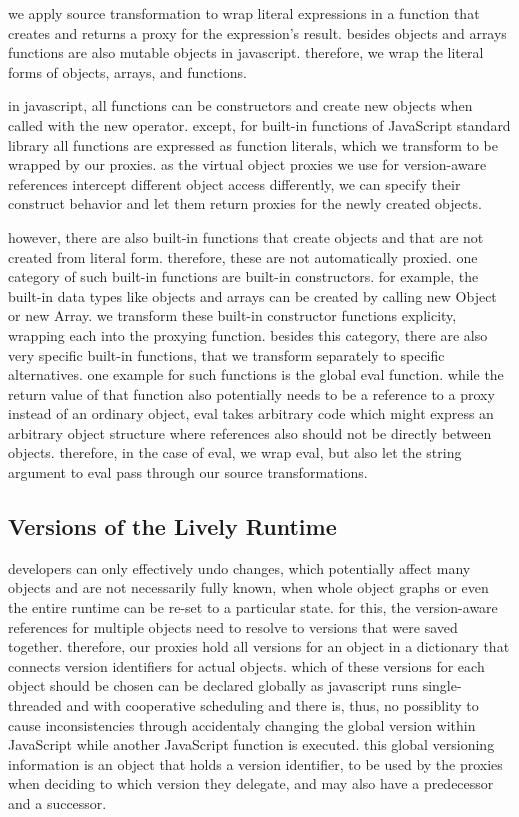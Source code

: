 we apply source transformation to wrap literal expressions in a function that creates and returns a proxy for the expression's result.
besides objects and arrays functions are also mutable objects in javascript.
therefore, we wrap the literal forms of objects, arrays, and functions.

in javascript, all functions can be constructors and create new objects when called with the new operator.
except, for built-in functions of JavaScript standard library all functions are expressed as function literals, which we transform to be wrapped by our proxies.
as the virtual object proxies we use for version-aware references intercept different object access differently, we can specify their construct behavior and let them return proxies for the newly created objects.

however, there are also built-in functions that create objects and that are not created from literal form.
therefore, these are not automatically proxied.
one category of such built-in functions are built-in constructors.
for example, the built-in data types like objects and arrays can be created by calling new Object or new Array.
we transform these built-in constructor functions explicity, wrapping each into the proxying function.
besides this category, there are also very specific built-in functions, that we transform separately to specific alternatives.
one example for such functions is the global eval function.
while the return value of that function also potentially needs to be a reference to a proxy instead of an ordinary object, eval takes arbitrary code which might express an arbitrary object structure where references also should not be directly between objects.
therefore, in the case of eval, we wrap eval, but also let the string argument to eval pass through our source transformations.


\subsection{Versions of the Lively Runtime}

developers can only effectively undo changes, which potentially affect many objects and are not necessarily fully known, when whole object graphs or even the entire runtime can be re-set to a particular state.
for this, the version-aware references for multiple objects need to resolve to versions that were saved together.
therefore, our proxies hold all versions for an object in a dictionary that connects version identifiers for actual objects.
which of these versions for each object should be chosen can be declared globally as javascript runs single-threaded and with cooperative scheduling and there is, thus, no possiblity to cause inconsistencies through accidentaly changing the global version within JavaScript while another JavaScript function is executed.
this global versioning information is an object that holds a version identifier, to be used by the proxies when deciding to which version they delegate, and may also have a predecessor and a successor.

